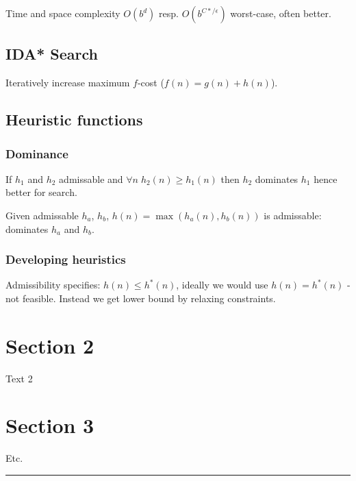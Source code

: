 \begin{multicols}{4}
Time and space complexity $O(b^d)$ resp. $O(b^{C*/\epsilon})$ worst-case, often better.

\subsection{IDA* Search}

Iteratively increase maximum $f$-cost ($f(n) = g(n)+h(n)$).

\subsection{Heuristic functions}

\subsubsection{Dominance}

If $h_1$ and $h_2$ admissable and $\forall n \; h_2(n) \geq h_1(n)$ then $h_2$ dominates $h_1$ hence better for search.

Given admissable $h_a$, $h_b$, $h(n) = \max(h_a(n), h_b(n))$ is admissable: dominates $h_a$ and $h_b$.

\subsubsection{Developing heuristics}

Admissibility specifies: $h(n) \leq h^*(n)$, ideally we would use $h(n) = h^*(n)$ - not feasible. Instead we get lower bound by relaxing constraints.

\section{Section 2}
Text 2

\section{Section 3}
Etc.

\rule{0.3\linewidth}{0.25pt}
\scriptsize



\end{multicols}